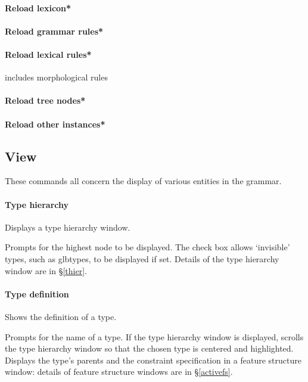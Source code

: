 \documentclass[12pt]{report}
\begin{document}
\paragraph{Reload lexicon*}

\paragraph{Reload grammar rules*}

\paragraph{Reload lexical rules*}
includes morphological rules

\paragraph{Reload tree nodes*}

\paragraph{Reload other instances*}


\subsection{View}
\label{view}

These commands all concern the display of various entities in the grammar.

\paragraph{Type hierarchy}
Displays a type hierarchy window.

Prompts for the highest node to be displayed.
The check box allows `invisible' types, such as glbtypes, to be
displayed if set.  Details of the type hierarchy window are in 
\S\ref{thier}.

\paragraph{Type definition}
\label{type-def}
Shows the definition of a type.

Prompts for the name of a type. 
If the type hierarchy window is displayed, scrolls the
type hierarchy window so that the chosen type is centered and
highlighted.  
Displays the type's
parents and the constraint specification in a feature
structure window:
details of feature structure windows are in \S\ref{activefs}.
\end{document}
